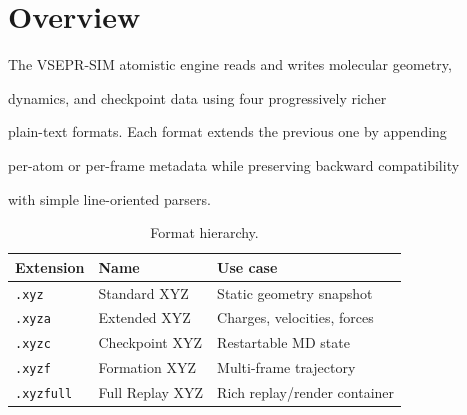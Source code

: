 \documentclass[12pt, a4paper, oneside]{article}
\begin{document}
\newpage






\newpage



\section{Overview}



The VSEPR-SIM atomistic engine reads and writes molecular geometry,

dynamics, and checkpoint data using four progressively richer

plain-text formats.  Each format extends the previous one by appending

per-atom or per-frame metadata while preserving backward compatibility

with simple line-oriented parsers.


\begin{table}[htbp]

  \centering

  \caption{Format hierarchy.}

  \label{tab:hierarchy}

  \begin{tabular}{llp{8cm}}

    \toprule

    Extension & Name & Use case \\

    \midrule

    \texttt{.xyz}     & Standard XYZ     & Static geometry snapshot \\

    \texttt{.xyza}    & Extended XYZ     & Charges, velocities, forces \\

    \texttt{.xyzc}    & Checkpoint XYZ   & Restartable MD state \\

    \texttt{.xyzf}    & Formation XYZ    & Multi-frame trajectory \\

    \texttt{.xyzfull} & Full Replay XYZ  & Rich replay/render container \\

    \bottomrule

  \end{tabular}

\end{table}
\end{document}
